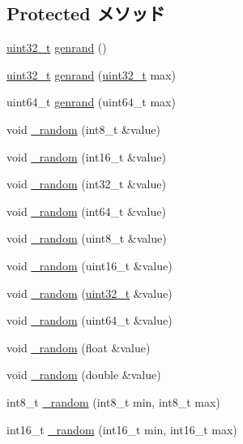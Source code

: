 \subsection*{Protected メソッド}
\begin{DoxyCompactItemize}
\item 
\hyperlink{Type_8hh_a435d1572bf3f880d55459d9805097f62}{uint32\_\-t} \hyperlink{classRandom_a01e55bb9c07b5c043b6092d0a4e1d297}{genrand} ()
\item 
\hyperlink{Type_8hh_a435d1572bf3f880d55459d9805097f62}{uint32\_\-t} \hyperlink{classRandom_a5693787c75a3629488eeaf62371e4131}{genrand} (\hyperlink{Type_8hh_a435d1572bf3f880d55459d9805097f62}{uint32\_\-t} max)
\item 
uint64\_\-t \hyperlink{classRandom_a82359e4b7fa67ab2d2ef1518765e1cf1}{genrand} (uint64\_\-t max)
\item 
void \hyperlink{classRandom_ac25bad8f8a49119c66d15434d0e6f7a4}{\_\-random} (int8\_\-t \&value)
\item 
void \hyperlink{classRandom_af2b5d710a4947ac49b1a7f88190dc059}{\_\-random} (int16\_\-t \&value)
\item 
void \hyperlink{classRandom_ae063fd8ac0eb9077a7d685f708fc05fc}{\_\-random} (int32\_\-t \&value)
\item 
void \hyperlink{classRandom_aaf3e7bfed1b9adb4682156f0409f3dd5}{\_\-random} (int64\_\-t \&value)
\item 
void \hyperlink{classRandom_ae79d375e5b04f8f85626a369080b043f}{\_\-random} (uint8\_\-t \&value)
\item 
void \hyperlink{classRandom_ada2f2689f2bb916337c7407d50629a17}{\_\-random} (uint16\_\-t \&value)
\item 
void \hyperlink{classRandom_adf77c07c3dd17f1a3503bde1577a465d}{\_\-random} (\hyperlink{Type_8hh_a435d1572bf3f880d55459d9805097f62}{uint32\_\-t} \&value)
\item 
void \hyperlink{classRandom_a7719e6e66fa0fc7b414657cae0ae179e}{\_\-random} (uint64\_\-t \&value)
\item 
void \hyperlink{classRandom_a96ad5752733f5bc0769c8910378958a8}{\_\-random} (float \&value)
\item 
void \hyperlink{classRandom_a220f0a1b909e4a2c624693f0310656bc}{\_\-random} (double \&value)
\item 
int8\_\-t \hyperlink{classRandom_ab0f436dd0b2823deb7a5a52c8b41d6f8}{\_\-random} (int8\_\-t min, int8\_\-t max)
\item 
int16\_\-t \hyperlink{classRandom_a8c35620ab378916d0f7c9b0bd856d5b4}{\_\-random} (int16\_\-t min, int16\_\-t max)

\end{DoxyCompactItemize}
